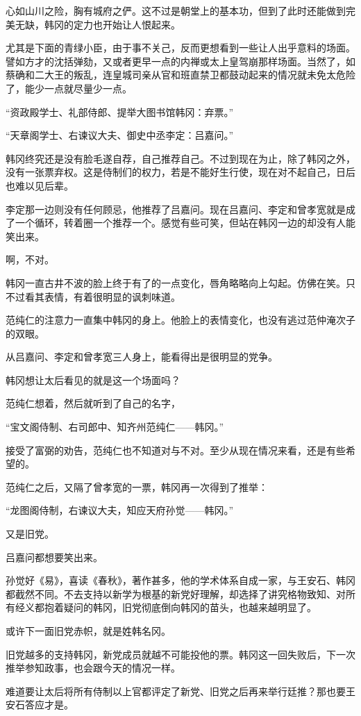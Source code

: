 心如山川之险，胸有城府之俨。这不过是朝堂上的基本功，但到了此时还能做到完美无缺，韩冈的定力也开始让人恨起来。

尤其是下面的青绿小臣，由于事不关己，反而更想看到一些让人出乎意料的场面。譬如方才的沈括弹劾，又或者更早一点的内禅或太上皇驾崩那样场面。当然了，如蔡确和二大王的叛乱，连皇城司亲从官和班直禁卫都鼓动起来的情况就未免太危险了，能少一点就尽量少一点。

“资政殿学士、礼部侍郎、提举大图书馆韩冈：弃票。”

“天章阁学士、右谏议大夫、御史中丞李定：吕嘉问。”

韩冈终究还是没有脸毛遂自荐，自己推荐自己。不过到现在为止，除了韩冈之外，没有一张票弃权。这是侍制们的权力，若是不能好生行使，现在对不起自己，日后也难以见后辈。

李定那一边则没有任何顾忌，他推荐了吕嘉问。现在吕嘉问、李定和曾孝宽就是成了一个循环，转着圈一个推荐一个。感觉有些可笑，但站在韩冈一边的却没有人能笑出来。

啊，不对。

韩冈一直古井不波的脸上终于有了的一点变化，唇角略略向上勾起。仿佛在笑。只不过看其表情，有着很明显的讽刺味道。

范纯仁的注意力一直集中韩冈的身上。他脸上的表情变化，也没有逃过范仲淹次子的双眼。

从吕嘉问、李定和曾孝宽三人身上，能看得出是很明显的党争。

韩冈想让太后看见的就是这一个场面吗？

范纯仁想着，然后就听到了自己的名字，

“宝文阁侍制、右司郎中、知齐州范纯仁——韩冈。”

接受了富弼的劝告，范纯仁也不知道对与不对。至少从现在情况来看，还是有些希望的。

范纯仁之后，又隔了曾孝宽的一票，韩冈再一次得到了推举：

“龙图阁侍制，右谏议大夫，知应天府孙觉——韩冈。”

又是旧党。

吕嘉问都想要笑出来。

孙觉好《易》，喜读《春秋》，著作甚多，他的学术体系自成一家，与王安石、韩冈都截然不同。不去支持以新学为根基的新党好理解，却选择了讲究格物致知、对所有经义都抱着疑问的韩冈，旧党彻底倒向韩冈的苗头，也越来越明显了。

或许下一面旧党赤帜，就是姓韩名冈。

旧党越多的支持韩冈，新党成员就越不可能投他的票。韩冈这一回失败后，下一次推举参知政事，也会跟今天的情况一样。

难道要让太后将所有侍制以上官都评定了新党、旧党之后再来举行廷推？那也要王安石答应才是。

